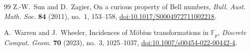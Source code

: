 \documentclass[11pt,reqno]{amsart}
\numberwithin{equation}{section}
\theoremstyle{definition}
\theoremstyle{remark}
\newcommand{\F}{\mathbb F}
\begin{document}
\begin{thebibliography}{99}
Z.-W.~Sun and D.~Zagier,
\newblock On a curious property of Bell numbers,
\newblock \emph{Bull. Aust. Math. Soc.} \textbf{84} (2011), no.~1, 153--158,
\newblock \href{https://doi.org/10.1017/S0004972711002218}{doi:10.1017/S0004972711002218}.

A.~Warren and J.~Wheeler,
\newblock Incidences of M\"obius transformations in $\F_p$,
\newblock \emph{Discrete Comput. Geom.} \textbf{70} (2023), no.~3, 1025--1037,
\newblock \href{https://doi.org/10.1007/s00454-022-00442-4}{doi:10.1007/s00454-022-00442-4}.

\end{thebibliography}
\end{document}
